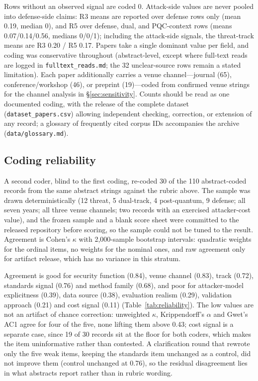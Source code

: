 Rows without an observed signal are coded 0. Attack-side values are never pooled into defense-side claims: R3 means are reported over defense rows only (mean 0.19, median 0), and R5 over defense, dual, and PQC-context rows (means 0.07/0.14/0.56, medians 0/0/1); including the attack-side signals, the threat-track means are R3 0.20 / R5 0.17. Papers take a single dominant value per field, and coding was conservative throughout (abstract-level, except where full-text reads are logged in \texttt{fulltext\_reads.md}; the 32 unclear-source rows remain a stated limitation). Each paper additionally carries a venue channel---journal (65), conference/workshop (46), or preprint (19)---coded from confirmed venue strings for the channel analysis in \S\ref{sec:sensitivity}. Counts should be read as one documented coding, with the release of the complete dataset (\texttt{dataset\_papers.csv}) allowing independent checking, correction, or extension of any record; a glossary of frequently cited corpus IDs accompanies the archive (\texttt{data/glossary.md}).

\subsection{Coding reliability}
\label{sec:reliability}
A second coder, blind to the first coding, re-coded 30 of the 110 abstract-coded records from the
same abstract strings against the rubric above. The sample was drawn deterministically (12 threat,
5 dual-track, 4 post-quantum, 9 defense; all seven years; all three venue channels; two records
with an exercised attacker-cost value), and the frozen sample and a blank score sheet were
committed to the released repository before scoring, so the sample could not be tuned to the
result. Agreement is Cohen's $\kappa$ with 2,000-sample bootstrap intervals: quadratic weights for
the ordinal items, no weights for the nominal ones, and raw agreement only for artifact release,
which has no variance in this stratum.

Agreement is good for security function (0.84), venue channel (0.83), track (0.72), standards
signal (0.76) and method family (0.68), and poor for attacker-model explicitness (0.39), data
source (0.38), evaluation realism (0.29), validation approach (0.21) and cost signal (0.11)
(Table~\ref{tab:reliability}). The low values are not an artifact of chance correction:
unweighted $\kappa$, Krippendorff's $\alpha$ and Gwet's AC1 agree for four of the five, none
lifting them above 0.43; cost signal is a separate case, since 19 of 30 records sit at the floor
for both coders, which makes the item uninformative rather than contested. A clarification round
that rewrote only the five weak items, keeping the standards item unchanged as a control, did not
improve them (control unchanged at 0.76), so the residual disagreement lies in what abstracts
report rather than in rubric wording.

